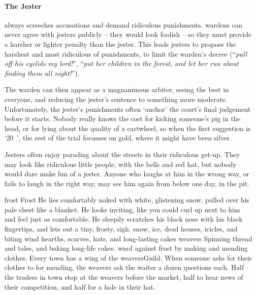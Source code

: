 \begin{multicols}{2}
\paragraph[the Jester]{The Jester}
\label{guildJester}%
always screeches accusations and demand ridiculous punishments.
\Glspl{warden} can never agree with jesters publicly -- they would look foolish -- so they must provide a harsher or lighter penalty than the jester.
This leads jesters to propose the harshest and most ridiculous of punishments, to limit the \gls{warden}'s decree (``\emph{pull off his eyelids my lord!}'', ``\emph{put her children in the forest, and let her run about finding them all night!}'').

The \gls{warden} can then appear as a magnanimous arbiter, seeing the best in everyone, and reducing the jester's sentence to something more moderate.
Unfortunately, the jester's punishments often `anchor' the court's final judgement before it starts.
Nobody really knows the cost for kicking someone's pig in the head, or for lying about the quality of a cartwheel, so when the first suggestion is `20~', the rest of the trial focusses on gold, where it might have been silver.

Jesters often enjoy parading about the streets in their ridiculous get-up.
They may look like ridiculous little people, with the bells and red hat, but nobody would dare make fun of a jester.
Anyone who laughs at him in the wrong way, or fails to laugh in the right way, may see him again from below one day, in the pit.

  {\gls{frost}}%
  {Frost}%
  {
    He lies comfortably naked with white, glistening snow, pulled over his pale chest like a blanket.
    He looks inviting, like you could curl up next to him and feel just as comfortable.
    He sleepily scratches his black nose with his black fingertips, and lets out a tiny, frosty, {\sffamily sigh}.
  }%
  {snow, ice, dead houses, icicles, and biting wind}%
  {hearths, scarves, hats, and long-lasting cakes}%
  {\Glspl{weaver}}%
  {
    Spinning thread and tales, and baking long-life cakes.
  }%
ward against frost by making and mending clothes.
Every town has a wing of the \gls{weaversGuild}.
When someone asks for their clothes to for mending, the weavers ask the waiter a dozen questions each.
Half the traders in town stop at the weavers before the market, half to hear news of their competition, and half for a hole in their hat.


\end{multicols}
